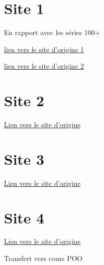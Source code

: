 \documentclass[12pt,a4paper]{exam}%
\begin{document}
\section{Site 1}
En rapport avec les séries 100+\par
\href{https://gist.github.com/KirosG/f265f136bd97bd669632fa0f2f2721b4}{lien vers le site d'origine 1}\par
\href{https://github.com/darkprinx/break-the-ice-with-python}{lien vers le site d'origine 2}
\begin{questions}



%

\end{questions}

\section{Site 2}

\href{https://github.com/4GeeksAcademy/master-python-programming-exercises/tree/master}{Lien vers le site d'origine}\par
\begin{questions}



\end{questions}
\section{Site 3}
\href{https://github.com/dbojado/python-exercises}{Lien vers le site d'origine}\par
\begin{questions}



\end{questions}
\section{Site 4}
\href{https://rtavenar.github.io/exos_python/gen/D_1_%20Objet%20_%20creation%20sans%20parametre.html}{Lien vers le site d'origine}\par
Transfert vers cours POO
%	
%	
\end{document}
